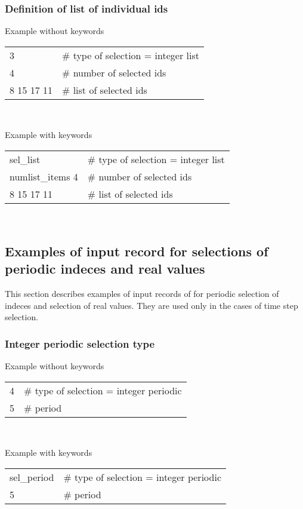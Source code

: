 \subsubsection{Definition of list of individual ids}
Example without keywords
\begin{center}
\begin{tabular}{|ll|}
\hline
3          & \# type of selection = integer list \\
4          & \# number of selected ids           \\
8 15 17 11 & \# list of selected ids             \\
\hline
\end{tabular}\\
\end{center}
Example with keywords
\begin{center}
\begin{tabular}{|ll|}
\hline
sel\_list        & \# type of selection = integer list \\
numlist\_items 4 & \# number of selected ids           \\
8 15 17 11       & \# list of selected ids             \\
\hline
\end{tabular}\\
\end{center}



\subsection{Examples of input record for selections of periodic indeces and real values} \label{timesel_ex}
This section describes examples of input records of for periodic selection of indeces 
and selection of real values. They are used only in the cases of time step selection.

\subsubsection{Integer periodic selection type}
Example without keywords
\begin{center}
\begin{tabular}{|ll|}
\hline
4 & \# type of selection = integer periodic \\
5 & \# period                               \\
\hline
\end{tabular}\\
\end{center}
Example with keywords
\begin{center}
\begin{tabular}{|ll|}
\hline
sel\_period & \# type of selection = integer periodic \\
5          & \# period                               \\
\hline
\end{tabular}\\
\end{center}



